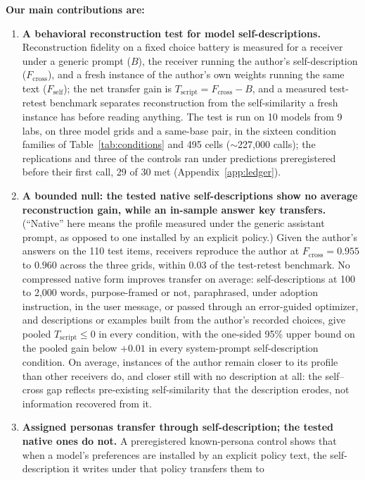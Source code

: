 \documentclass[11pt]{article}
\newcommand{\Fself}{F_{\mathrm{self}}}
\newcommand{\Fcross}{F_{\mathrm{cross}}}
\newcommand{\B}{B}
\newcommand{\Tscript}{T_{\mathrm{script}}}
\begin{document}
\textbf{Our main contributions are:}
\begin{enumerate}
  \item \textbf{A behavioral reconstruction test for model
  self-descriptions.} Reconstruction fidelity on a fixed choice battery is
  measured for a receiver under a generic prompt ($\B$), the receiver running
  the author's self-description ($\Fcross$), and a fresh instance of the
  author's own weights running the same text ($\Fself$); the net transfer
  gain is $\Tscript = \Fcross - \B$, and a measured test-retest benchmark
  separates reconstruction from the self-similarity a fresh instance has
  before reading anything. The test is run on 10 models from 9 labs, on
  three model grids and a same-base pair, in the sixteen condition families
  of Table~\ref{tab:conditions} and 495 cells ($\sim$227{,}000 calls); the
  replications and three of the controls ran under predictions
  preregistered before their first call, 29 of 30 met
  (Appendix~\ref{app:ledger}).
  \item \textbf{A bounded null: the tested native self-descriptions show no
  average reconstruction gain, while an in-sample answer key transfers.}
  (``Native'' here means the profile measured under the generic assistant
  prompt, as opposed to one installed by an explicit policy.)
  Given the author's answers on the 110 test items, receivers reproduce the
  author at $\Fcross = 0.955$ to $0.960$ across the three grids, within
  $0.03$ of the test-retest benchmark. No compressed native form improves
  transfer on average: self-descriptions at 100 to 2{,}000 words,
  purpose-framed or not, paraphrased, under adoption instruction, in the
  user message, or passed through an error-guided optimizer, and
  descriptions or examples built from the author's recorded choices, give
  pooled $\Tscript \le 0$ in every condition, with the one-sided 95\% upper
  bound on the pooled gain below $+0.01$ in every system-prompt
  self-description condition. On average, instances of the author remain
  closer to its profile than other receivers do, and closer still with no
  description at all: the self--cross gap reflects pre-existing
  self-similarity that the description erodes, not information recovered
  from it.
  \item \textbf{Assigned personas transfer through self-description; the
  tested native ones do not.} A preregistered known-persona control shows
  that when a model's preferences are installed by an explicit policy text,
  the self-description it writes under that policy transfers them to

\end{enumerate}
\end{document}
